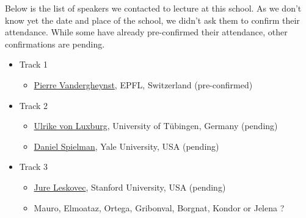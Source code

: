 \documentclass[a4paper]{scrartcl}
\begin{document}
Below is the list of speakers we contacted to lecture at this school. As we
don't know yet the date and place of the school, we didn't ask them to confirm
their attendance. While some have already pre-confirmed their attendance, other
confirmations are pending.
\begin{itemize}
\setlength{\itemsep}{0pt} \setlength{\parskip}{0pt}
\item Track 1
	\begin{itemize}
	\setlength{\itemsep}{0pt} \setlength{\parskip}{0pt}
	\item \href{http://people.epfl.ch/pierre.vandergheynst}
		{Pierre Vandergheynst}, EPFL, Switzerland
		(pre-confirmed)
	\end{itemize}
\item Track 2
	\begin{itemize}
	\setlength{\itemsep}{0pt} \setlength{\parskip}{0pt}
	\item \href{http://www.wsi.uni-tuebingen.de/lehrstuehle/theory-of-machine-learning/people/ulrike-von-luxburg.html}
		{Ulrike von Luxburg}, University of Tübingen, Germany
		(pending)
	\item \href{http://www.cs.yale.edu/homes/spielman/}
		{Daniel Spielman}, Yale University, USA
		(pending)
	\end{itemize}
\item Track 3
	\begin{itemize}
	\setlength{\itemsep}{0pt} \setlength{\parskip}{0pt}
	\item \href{http://cs.stanford.edu/people/jure/}
		{Jure Leskovec}, Stanford University, USA
		(pending)
	\item Mauro, Elmoataz, Ortega, Gribonval, Borgnat, Kondor or Jelena ?
	\end{itemize}
\end{itemize}
\end{document}
